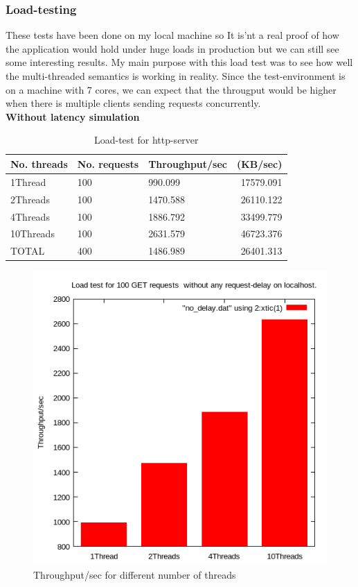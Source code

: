 \documentclass[a4paper, 11pt]{article}
\begin{document}
\subsubsection{Load-testing}
These tests have been done on my local machine so It is'nt a real proof of how the application would hold under huge loads in production but we can still see some interesting results.
My main purpose with this load test was to see how well the multi-threaded semantics is working in reality. Since the test-environment is on a machine with 7 cores, we can expect that the througput would be higher when there is multiple clients sending requests concurrently. \\
\textbf{Without latency simulation}
\begin{table}[H]
\centering
\label{Load-test for http-server}
\begin{tabular}{|l|l|l|r|}
\hline
\textbf{No. threads}  & \textbf{No. requests}  & \textbf{Throughput/sec} & \textbf{(KB/sec)} \\ \hline
1Thread & 100 & 990.099 & 17579.091 \\ \hline
2Threads & 100 & 1470.588 & 26110.122 \\ \hline
4Threads & 100 & 1886.792 & 33499.779 \\ \hline
10Threads & 100 & 2631.579 & 46723.376 \\ \hline
TOTAL & 400 & 1486.989 & 26401.313 \\ \hline
\end{tabular}
\caption{Load-test for http-server}
\end{table}
\begin{figure}[H]
\includegraphics[scale=0.7]{no_delay.png}
\caption{Throughput/sec for different number of threads}
\end{figure}
\end{document}
